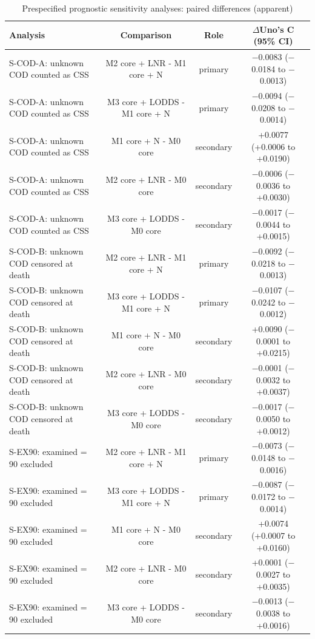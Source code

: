 \begin{table}[htbp]
\caption{Prespecified prognostic sensitivity analyses: paired differences (apparent)}\label{tab:s11_prognostic_sensitivity_paired}
\scriptsize
\begin{tabular*}{\textwidth}{@{\extracolsep{\fill}}lccc@{}}
\toprule
Analysis & Comparison & Role & $\Delta$Uno's C (95\% CI) \\
\midrule
S-COD-A: unknown COD counted as CSS & M2 core + LNR - M1 core + N & primary & $-$0.0083 ($-$0.0184 to $-$0.0013) \\
S-COD-A: unknown COD counted as CSS & M3 core + LODDS - M1 core + N & primary & $-$0.0094 ($-$0.0208 to $-$0.0014) \\
S-COD-A: unknown COD counted as CSS & M1 core + N - M0 core & secondary & +0.0077 (+0.0006 to +0.0190) \\
S-COD-A: unknown COD counted as CSS & M2 core + LNR - M0 core & secondary & $-$0.0006 ($-$0.0036 to +0.0030) \\
S-COD-A: unknown COD counted as CSS & M3 core + LODDS - M0 core & secondary & $-$0.0017 ($-$0.0044 to +0.0015) \\
S-COD-B: unknown COD censored at death & M2 core + LNR - M1 core + N & primary & $-$0.0092 ($-$0.0218 to $-$0.0013) \\
S-COD-B: unknown COD censored at death & M3 core + LODDS - M1 core + N & primary & $-$0.0107 ($-$0.0242 to $-$0.0012) \\
S-COD-B: unknown COD censored at death & M1 core + N - M0 core & secondary & +0.0090 ($-$0.0001 to +0.0215) \\
S-COD-B: unknown COD censored at death & M2 core + LNR - M0 core & secondary & $-$0.0001 ($-$0.0032 to +0.0037) \\
S-COD-B: unknown COD censored at death & M3 core + LODDS - M0 core & secondary & $-$0.0017 ($-$0.0050 to +0.0012) \\
S-EX90: examined = 90 excluded & M2 core + LNR - M1 core + N & primary & $-$0.0073 ($-$0.0148 to $-$0.0016) \\
S-EX90: examined = 90 excluded & M3 core + LODDS - M1 core + N & primary & $-$0.0087 ($-$0.0172 to $-$0.0014) \\
S-EX90: examined = 90 excluded & M1 core + N - M0 core & secondary & +0.0074 (+0.0007 to +0.0160) \\
S-EX90: examined = 90 excluded & M2 core + LNR - M0 core & secondary & +0.0001 ($-$0.0027 to +0.0035) \\
S-EX90: examined = 90 excluded & M3 core + LODDS - M0 core & secondary & $-$0.0013 ($-$0.0038 to +0.0016) \\

\end{tabular*}
\end{table}
